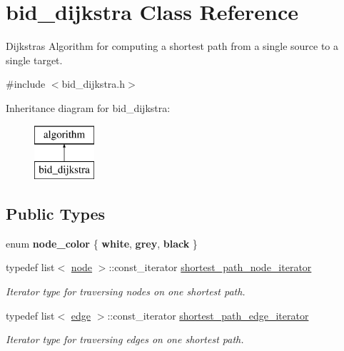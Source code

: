\hypertarget{classbid__dijkstra}{}\section{bid\+\_\+dijkstra Class Reference}
\label{classbid__dijkstra}


Dijkstra\textquotesingle{}s Algorithm for computing a shortest path from a single source to a single target.  




{\ttfamily \#include $<$bid\+\_\+dijkstra.\+h$>$}

Inheritance diagram for bid\+\_\+dijkstra\+:\begin{figure}[H]
\begin{center}
\leavevmode
\includegraphics[height=2.000000cm]{classbid__dijkstra}
\end{center}
\end{figure}
\subsection*{Public Types}
\begin{DoxyCompactItemize}
\item 
\mbox{\label{classbid__dijkstra_a8b7dcccc9fab2ec5edc8da01029c09d5}} 
enum {\bfseries node\+\_\+color} \{ {\bfseries white}, 
{\bfseries grey}, 
{\bfseries black}
 \}
\item 
\mbox{\label{classbid__dijkstra_ada2e642d9f0582d30fe1dd51c4aa1899}} 
typedef list$<$ \mbox{\hyperlink{classnode}{node}} $>$\+::const\+\_\+iterator \mbox{\hyperlink{classbid__dijkstra_ada2e642d9f0582d30fe1dd51c4aa1899}{shortest\+\_\+path\+\_\+node\+\_\+iterator}}
\begin{DoxyCompactList}\small\item\em Iterator type for traversing nodes on one shortest path. \end{DoxyCompactList}\item 
\mbox{\label{classbid__dijkstra_a703d0faf9568bc25a9305faa61412fe1}} 
typedef list$<$ \mbox{\hyperlink{classedge}{edge}} $>$\+::const\+\_\+iterator \mbox{\hyperlink{classbid__dijkstra_a703d0faf9568bc25a9305faa61412fe1}{shortest\+\_\+path\+\_\+edge\+\_\+iterator}}
\begin{DoxyCompactList}\small\item\em Iterator type for traversing edges on one shortest path. \end{DoxyCompactList}\end{DoxyCompactItemize}

